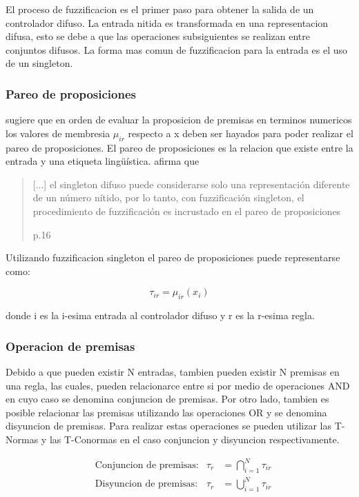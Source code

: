             El proceso de fuzzificacion es el primer paso para obtener la salida de un controlador difuso. La entrada nitida es transformada en una representacion difusa, esto se debe a que las operaciones subsiguientes se realizan entre conjuntos difusos. La forma mas comun de fuzzificacion para la entrada es el uso de un singleton.
            
        \subsubsection{Pareo de proposiciones}
            
            \textcite{riid2003transparent} sugiere que en orden de evaluar la proposicion de premisas en terminos numericos los valores de membresia $\mu_{ir}$ respecto a x deben ser hayados para poder realizar el pareo de proposiciones. El pareo de proposiciones es la relacion que existe entre la entrada y una etiqueta lingüística. \textcite{riid2003transparent} afirma que \blockquote[p.16]{[...] el singleton difuso puede considerarse solo una representación diferente de un número nítido, por lo tanto, con fuzzificación singleton, el procedimiento de fuzzificación es incrustado en el pareo de proposiciones}. Utilizando fuzzificacion singleton el pareo de proposiciones puede representarse como:

            \begin{equation}\label{eq:preposiciones}
                \tau_{ir} = \mu_{ir}(x_i)
            \end{equation}

            \noindent donde i es la i-esima entrada al controlador difuso y r es la r-esima regla.
            
        \subsubsection{Operacion de premisas}
            
            Debido a que pueden existir N entradas, tambien pueden existir N premisas en una regla, las cuales, pueden relacionarce entre si por medio de operaciones AND en cuyo caso se denomina conjuncion de premisas. Por otro lado, tambien es posible relacionar las premisas utilizando las operaciones OR y se denomina disyuncion de premisas. Para realizar estas operaciones se pueden utilizar las T-Normas y las T-Conormas en el caso conjuncion y disyuncion respectivamente.

            \begin{align}
                &\text{Conjuncion de premisas:} & \tau_{r} &= \bigcap_{i=1}^{N}\tau_{ir} \label{eq:conjP} \\
                &\text{Disyuncion de premisas:} & \tau_{r} &= \bigcup_{i=1}^{N}\tau_{ir} \label{eq:disyP}
            \end{align}

